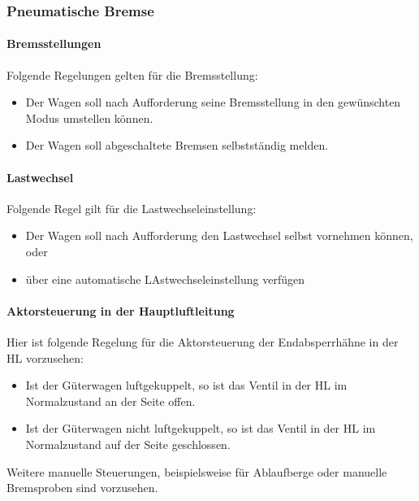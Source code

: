 \subsubsection{Pneumatische Bremse}
\paragraph{Bremsstellungen}
\begin{feat}
Folgende Regelungen gelten für die Bremsstellung:
\begin{itemize}
    \item Der Wagen soll nach Aufforderung seine Bremsstellung in den gewünschten Modus umstellen können.
    \item Der Wagen soll abgeschaltete Bremsen selbstständig melden.
\end{itemize}
\end{feat}

\paragraph{Lastwechsel}
\begin{feat}
Folgende Regel gilt für die Lastwechseleinstellung:
\begin{itemize}
    \item Der Wagen soll nach Aufforderung den Lastwechsel selbst vornehmen können, oder
    \item über eine automatische LAstwechseleinstellung verfügen
\end{itemize}
\end{feat}

\paragraph{Aktorsteuerung in der Hauptluftleitung}
\begin{feat}
Hier ist folgende Regelung für die Aktorsteuerung der Endabsperrhähne in der \acrshort{HL} vorzusehen:
\begin{itemize}
    \item Ist der Güterwagen luftgekuppelt, so ist das Ventil in der \acrshort{HL} im Normalzustand an der Seite offen.
    \item Ist der Güterwagen nicht luftgekuppelt, so ist das Ventil in der \acrshort{HL} im Normalzustand auf der Seite geschlossen.
\end{itemize}
\end{feat}
\begin{rem} [zu Anf. 43]
Weitere manuelle Steuerungen, beispielsweise für Ablaufberge oder manuelle Bremsproben sind vorzusehen.
\end{rem}


